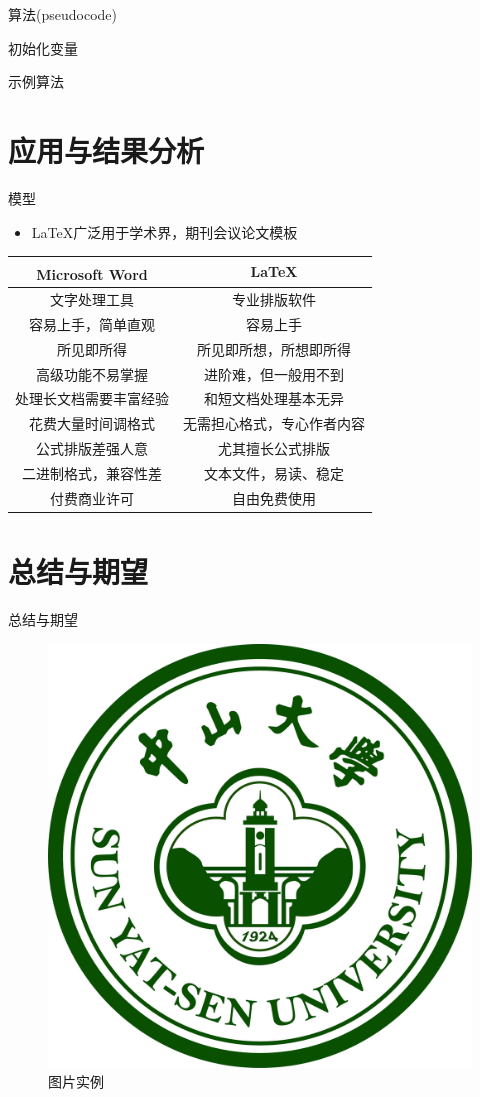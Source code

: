 \documentclass[
10pt,
aspectratio=169,
]{beamer}
\begin{document}
\begin{frame}{算法(pseudocode)}
\begin{algorithm}[H]
	\SetAlgoLined
	初始化变量\;
	\caption{示例算法}
\end{algorithm}
\end{frame}

\section{应用与结果分析}
\begin{frame}{模型}
	\begin{itemize}
		\item \LaTeX 广泛用于学术界，期刊会议论文模板
	\end{itemize}
	\begin{table}[h]
		\centering
		\begin{tabular}{c|c}
			Microsoft\textsuperscript{\textregistered}  Word & \LaTeX \\
			\hline
			文字处理工具 & 专业排版软件 \\
			容易上手，简单直观 & 容易上手 \\
			所见即所得 & 所见即所想，所想即所得 \\
			高级功能不易掌握 & 进阶难，但一般用不到 \\
			处理长文档需要丰富经验 & 和短文档处理基本无异 \\
			花费大量时间调格式 & 无需担心格式，专心作者内容 \\
			公式排版差强人意 & 尤其擅长公式排版 \\
			二进制格式，兼容性差 & 文本文件，易读、稳定 \\
			付费商业许可 & 自由免费使用 \\
		\end{tabular}
	\end{table}
\end{frame}

\section{总结与期望}
\begin{frame}{总结与期望}
	\begin{figure}[htbp]
		\centering
		\includegraphics[width=0.45\linewidth]{sysu_big_logo.jpeg}
		\caption{图片实例}
		\label{fig:1}
	\end{figure}
\end{frame}
\end{document}

